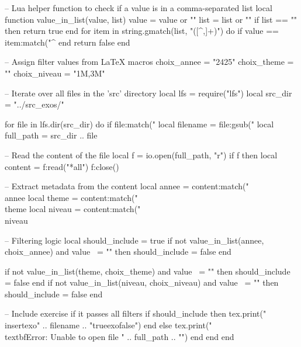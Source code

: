 \documentclass[a4paper,12pt]{report}
\def\choixAnnee{2425}
\def\choixTheme{}
\def\choixNiveau{1M,3M}
\edef\luaChoixAnnee{\choixAnnee}
\edef\luaChoixTheme{\choixTheme}
\edef\luaChoixNiveau{\choixNiveau}
\begin{document}
\begin{luacode}

-- Lua helper function to check if a value is in a comma-separated list
local function value_in_list(value, list)
    value = value or ""
    list = list or ""
    if list == "" then return true end
    for item in string.gmatch(list, "([^,]+)") do
        if value == item:match("^%
    end
    return false
end

-- Assign filter values from LaTeX macros
choix_annee = "\luaChoixAnnee"
choix_theme = "\luaChoixTheme"
choix_niveau = "\luaChoixNiveau"

-- Iterate over all files in the 'src' directory
local lfs = require("lfs")
local src_dir = "../src_exos/"

for file in lfs.dir(src_dir) do
    if file:match("%
        local filename = file:gsub("%
        local full_path = src_dir .. file
        
        -- Read the content of the file
        local f = io.open(full_path, "r")
        if f then
            local content = f:read("*all")
            f:close()
            
            -- Extract metadata from the content
            local annee = content:match("\\annee%
            local theme = content:match("\\theme%
            local niveau = content:match("\\niveau%
            
            -- Filtering logic
            local should_include = true
            if not value_in_list(annee, choix_annee) and value ~= "" then
                should_include = false
            end

            if not value_in_list(theme, choix_theme) and value ~= "" then
                should_include = false
            end
            if not value_in_list(niveau, choix_niveau) and value ~= "" then
                should_include = false
            end
            
            -- Include exercise if it passes all filters
            if should_include then
            	tex.print("\\insertexo{" .. filename .. "}{true}{exo}{false}")
            end
        else
            tex.print("\\textbf{Error: Unable to open file " .. full_path .. "}")
        end
    end
end
\end{luacode}
\end{document}
